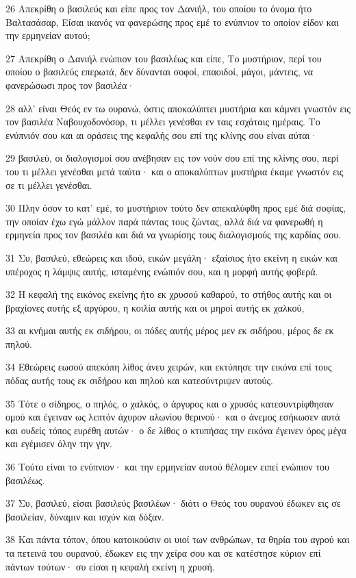 \par 26 Απεκρίθη ο βασιλεύς και είπε προς τον Δανιήλ, του οποίου το όνομα ήτο Βαλτασάσαρ, Είσαι ικανός να φανερώσης προς εμέ το ενύπνιον το οποίον είδον και την ερμηνείαν αυτού;
\par 27 Απεκρίθη ο Δανιήλ ενώπιον του βασιλέως και είπε, Το μυστήριον, περί του οποίου ο βασιλεύς επερωτά, δεν δύνανται σοφοί, επαοιδοί, μάγοι, μάντεις, να φανερώσωσι προς τον βασιλέα·
\par 28 αλλ' είναι Θεός εν τω ουρανώ, όστις αποκαλύπτει μυστήρια και κάμνει γνωστόν εις τον βασιλέα Ναβουχοδονόσορ, τι μέλλει γενέσθαι εν ταις εσχάταις ημέραις. Το ενύπνιόν σου και αι οράσεις της κεφαλής σου επί της κλίνης σου είναι αύται·
\par 29 βασιλεύ, οι διαλογισμοί σου ανέβησαν εις τον νούν σου επί της κλίνης σου, περί του τι μέλλει γενέσθαι μετά ταύτα· και ο αποκαλύπτων μυστήρια έκαμε γνωστόν εις σε τι μέλλει γενέσθαι.
\par 30 Πλην όσον το κατ' εμέ, το μυστήριον τούτο δεν απεκαλύφθη προς εμέ διά σοφίας, την οποίαν έχω εγώ μάλλον παρά πάντας τους ζώντας, αλλά διά να φανερωθή η ερμηνεία προς τον βασιλέα και διά να γνωρίσης τους διαλογισμούς της καρδίας σου.
\par 31 Συ, βασιλεύ, εθεώρεις και ιδού, εικών μεγάλη· εξαίσιος ήτο εκείνη η εικών και υπέροχος η λάμψις αυτής, ισταμένης ενώπιόν σου, και η μορφή αυτής φοβερά.
\par 32 Η κεφαλή της εικόνος εκείνης ήτο εκ χρυσού καθαρού, το στήθος αυτής και οι βραχίονες αυτής εξ αργύρου, η κοιλία αυτής και οι μηροί αυτής εκ χαλκού,
\par 33 αι κνήμαι αυτής εκ σιδήρου, οι πόδες αυτής μέρος μεν εκ σιδήρου, μέρος δε εκ πηλού.
\par 34 Εθεώρεις εωσού απεκόπη λίθος άνευ χειρών, και εκτύπησε την εικόνα επί τους πόδας αυτής τους εκ σιδήρου και πηλού και κατεσύντριψεν αυτούς.
\par 35 Τότε ο σίδηρος, ο πηλός, ο χαλκός, ο άργυρος και ο χρυσός κατεσυντρίφθησαν ομού και έγειναν ως λεπτόν άχυρον αλωνίου θερινού· και ο άνεμος εσήκωσεν αυτά και ουδείς τόπος ευρέθη αυτών· ο δε λίθος ο κτυπήσας την εικόνα έγεινεν όρος μέγα και εγέμισεν όλην την γην.
\par 36 Τούτο είναι το ενύπνιον· και την ερμηνείαν αυτού θέλομεν ειπεί ενώπιον του βασιλέως.
\par 37 Συ, βασιλεύ, είσαι βασιλεύς βασιλέων· διότι ο Θεός του ουρανού έδωκεν εις σε βασιλείαν, δύναμιν και ισχύν και δόξαν.
\par 38 Και πάντα τόπον, όπου κατοικούσιν οι υιοί των ανθρώπων, τα θηρία του αγρού και τα πετεινά του ουρανού, έδωκεν εις την χείρα σου και σε κατέστησε κύριον επί πάντων τούτων· συ είσαι η κεφαλή εκείνη η χρυσή.
